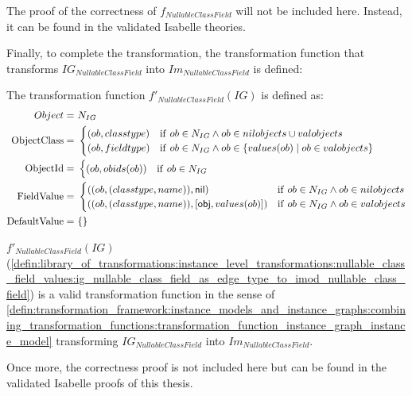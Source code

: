 The proof of the correctness of $f_{NullableClassField}$ will not be included here. Instead, it can be found in the validated Isabelle theories.

Finally, to complete the transformation, the transformation function that transforms $IG_{NullableClassField}$ into $Im_{NullableClassField}$ is defined:

\begin{defin}
\label{defin:library_of_transformations:instance_level_transformations:nullable_class_field_values:ig_nullable_class_field_as_edge_type_to_imod_nullable_class_field}
The transformation function $f'_{NullableClassField}(IG)$ is defined as:
\begin{align*}
Object =\ &N_{IG} \\
\mathrm{ObjectClass} =\ & \begin{cases}
    (ob, classtype) & \mathrm{if }\ ob \in N_{IG} \land ob \in nilobjects \cup valobjects \\
    (ob, fieldtype) & \mathrm{if }\ ob \in N_{IG} \land ob \in \{values(ob) \mid ob \in valobjects\}
\end{cases}\\
\mathrm{ObjectId} =\ & \begin{cases}
    (ob, obids(ob)) & \mathrm{if }\ ob \in N_{IG}
\end{cases}\\
\mathrm{FieldValue} =\ & \begin{cases}
    ((ob, (classtype, name)), \mathsf{nil}) & \mathrm{if }\ ob \in N_{IG} \land ob \in nilobjects\\
    ((ob, (classtype, name)), [\mathsf{obj}, values(ob)]) & \mathrm{if }\ ob \in N_{IG} \land ob \in valobjects
\end{cases} \\
\mathrm{DefaultValue} =\ & \{\}
\end{align*}
\end{defin}

\begin{thm}
\label{defin:library_of_transformations:instance_level_transformations:nullable_class_field_values:ig_nullable_class_field_as_edge_type_to_tmod_class_func}
$f'_{NullableClassField}(IG)$ (\cref{defin:library_of_transformations:instance_level_transformations:nullable_class_field_values:ig_nullable_class_field_as_edge_type_to_imod_nullable_class_field}) is a valid transformation function in the sense of \cref{defin:transformation_framework:instance_models_and_instance_graphs:combining_transformation_functions:transformation_function_instance_graph_instance_model} transforming $IG_{NullableClassField}$ into $Im_{NullableClassField}$.
\end{thm}

Once more, the correctness proof is not included here but can be found in the validated Isabelle proofs of this thesis.
